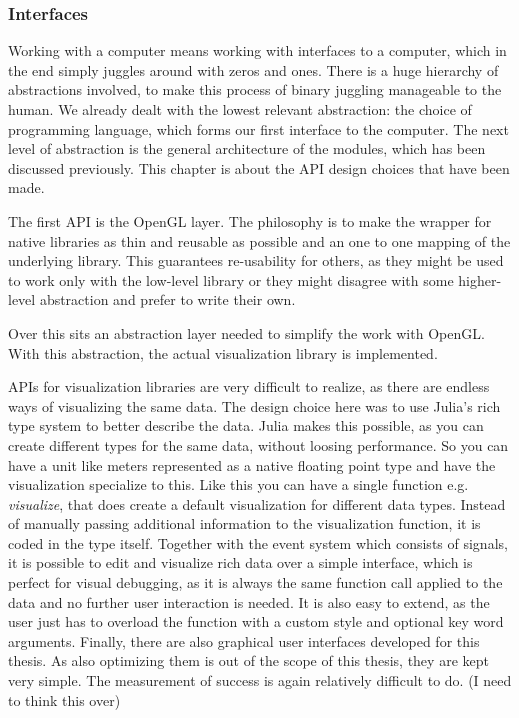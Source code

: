 \subsubsection{Interfaces}

Working with a computer means working with interfaces to a computer, which in the end simply juggles around with zeros and ones. There is a huge hierarchy of abstractions involved, to make this process of binary juggling manageable to the human.
We already dealt with the lowest relevant abstraction: the choice of programming language, which forms our first interface to the computer.
The next level of abstraction is the general architecture of the modules, which has been discussed previously. 
This chapter is about the API design choices that have been made.

The first API is the \ac{OpenGL} layer. 
The philosophy is to make the wrapper for native libraries as thin and reusable as possible and an one to one mapping of the underlying library.
This guarantees re-usability for others, as they might be used to work only with the low-level library or they might disagree with some higher-level abstraction and prefer to write their own.

Over this sits an abstraction layer needed to simplify the work with \ac{OpenGL}.
With this abstraction, the actual visualization library is implemented.

\ac{API}s for visualization libraries are very difficult to realize, as there are endless ways of visualizing the same data.
The design choice here was to use Julia's rich type system to better describe the data. 
Julia makes this possible, as you can create different types for the same data, without loosing performance.
So you can have a unit like meters represented as a native floating point type and have the visualization specialize to this.
Like this you can have a single function e.g. \textit{visualize}, that does create a default visualization for different data types. Instead of manually passing additional information to the visualization function, it is coded in the type itself.
Together with the event system which consists of signals, it is possible to edit and visualize rich data over a simple interface, which is perfect for visual debugging, as it is always the same function call applied to the data and no further user interaction is needed.
It is also easy to extend, as the user just has to overload the function with a custom style and optional key word arguments.
Finally, there are also graphical user interfaces developed for this thesis. As also optimizing them is out of the scope of this thesis, they are kept very simple.
The measurement of success is again relatively difficult to do. (I need to think this over)






